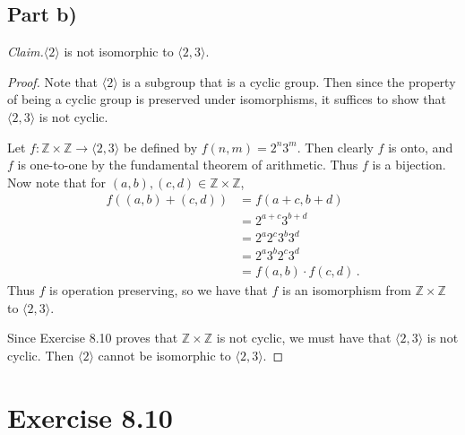\documentclass{abrice}
\newcommand{\Z}{\mathbb{Z}}
\newcommand{\Claim}{\noindent\emph{Claim.}\xspace}%
\begin{document}
\subsection{Part b)}

\Claim $\langle 2 \rangle$ is not isomorphic to $\langle 2,3 \rangle$.

\begin{proof}

  Note that $\langle 2 \rangle$ is a subgroup that is a cyclic group. Then since
  the property of being a cyclic group is preserved under isomorphisms, it
  suffices to show that $\langle 2, 3 \rangle$ is not cyclic.

  Let $f : \Z \times \Z \to \langle 2,3 \rangle$ be defined by $f(n,m) = 2^n
  3^m$. Then clearly $f$ is onto, and $f$ is one-to-one by the fundamental
  theorem of arithmetic. Thus $f$ is a bijection. Now note that for $(a,b),(c,d)
  \in \Z \times \Z$,
  \begin{align*}
    f((a,b) + (c,d))
    &= f(a+c, b + d) \\
    &= 2^{a+c} 3^{b+d} \\
    &= 2^a 2^c 3^b 3^d \\
    &= 2^a 3^b 2^c 3^d \\
    &= f(a,b) \cdot f(c,d)\, .
  \end{align*}
  Thus $f$ is operation preserving, so we have that $f$ is an isomorphism from
  $\Z \times \Z$ to $\langle 2,3 \rangle$.

  Since Exercise 8.10 proves that $\Z \times \Z$ is not cyclic, we must have
  that $\langle 2,3 \rangle$ is not cyclic. Then $\langle 2 \rangle$ cannot be
  isomorphic to $\langle 2,3 \rangle$.
\end{proof}

\section{Exercise 8.10}
\end{document}
